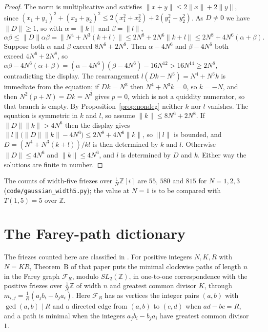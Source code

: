\documentclass[11pt]{article}
\theoremstyle{plain}
\theoremstyle{definition}
\newcommand{\Z}{\mathbb{Z}}
\newcommand{\lat}{\tfrac{1}{N}\Z}
\begin{document}
\begin{proof}
The norm is multiplicative and satisfies $\lVert x+y\rVert\le2\lVert x\rVert+2\lVert
y\rVert$, since $(x_1+y_1)^2+(x_2+y_2)^2\le2(x_1^2+x_2^2)+2(y_1^2+y_2^2)$. As $D\neq0$ we
have $\lVert D\rVert\ge1$, so with $\alpha=\lVert k\rVert$ and $\beta=\lVert l\rVert$,
\[
  \alpha\beta\le\lVert D\rVert\alpha\beta=\lVert N^4+N^3(k+l)\rVert
    \le 2N^8+2N^6\lVert k+l\rVert\le 2N^8+4N^6(\alpha+\beta).
\]
Suppose both $\alpha$ and $\beta$ exceed $8N^6+2N^8$. Then $\alpha-4N^6$ and $\beta-4N^6$
both exceed $4N^6+2N^8$, so
$\alpha\beta-4N^6(\alpha+\beta)=(\alpha-4N^6)(\beta-4N^6)-16N^{12}>16N^{14}\ge2N^8$,
contradicting the display. The rearrangement $l(Dk-N^3)=N^4+N^3k$ is immediate from the
equation; if $Dk=N^3$ then $N^4+N^3k=0$, so $k=-N$, and then $N^2(p+N)=Dk=N^3$ gives $p=0$,
which is not a quiddity numerator, so that branch is empty. By
Proposition~\ref{prop:nondeg} neither $k$ nor $l$ vanishes. The equation is symmetric in $k$
and $l$, so assume $\lVert k\rVert\le 8N^6+2N^8$. If $\lVert D\rVert\lVert k\rVert>4N^6$
then the display gives $\lVert l\rVert\bigl(\lVert D\rVert\lVert k\rVert-4N^6\bigr)\le
2N^8+4N^6\lVert k\rVert$, so $\lVert l\rVert$ is bounded, and $D=(N^4+N^3(k+l))/kl$ is then
determined by $k$ and $l$. Otherwise $\lVert D\rVert\le4N^6$ and $\lVert k\rVert\le4N^6$,
and $l$ is determined by $D$ and $k$. Either way the solutions are finite in number.
\end{proof}

The counts of width-five friezes over $\tfrac1N\Z[i]$ are $55$, $580$ and $815$ for
$N=1,2,3$ (\texttt{code/gaussian\_width5.py}); the value at $N=1$ is to be compared with
$T(1,5)=5$ over $\Z$.

\section{The Farey-path dictionary}\label{sec:farey}

The friezes counted here are classified in \cite{KSSZ}. For positive integers $N,K,R$ with
$N=KR$, Theorem~B of that paper puts the minimal clockwise paths of length $n$ in the Farey
graph $\mathcal F_R$, modulo $SL_2(\Z)$, in one-to-one correspondence with the positive
friezes over $\lat$ of width $n$ and greatest common divisor $K$, through
$m_{i,j}=\frac1R(a_jb_i-b_ja_i)$. Here $\mathcal F_R$ has as vertices the integer pairs
$(a,b)$ with $\gcd(a,b)\mid R$ and a directed edge from $(a,b)$ to $(c,d)$ when $ad-bc=R$,
and a path is minimal when the integers $a_jb_i-b_ja_i$ have greatest common divisor $1$.
\end{document}
